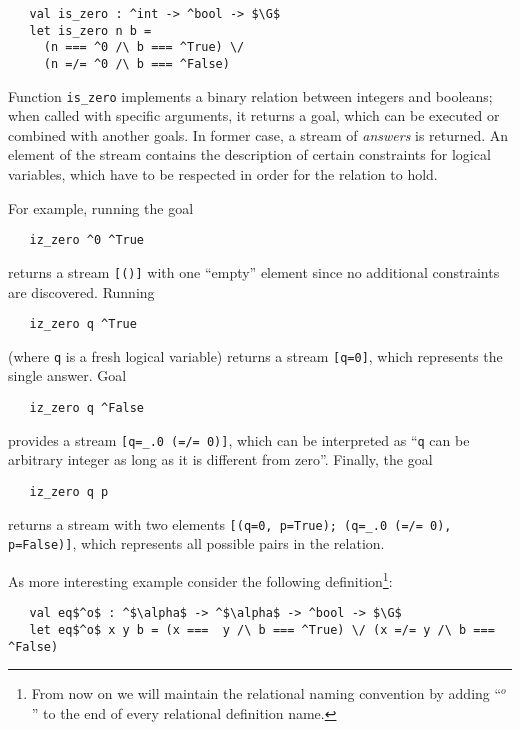 \begin{lstlisting}
   val is_zero : ^int -> ^bool -> $\G$
   let is_zero n b = 
     (n === ^0 /\ b === ^True) \/
     (n =/= ^0 /\ b === ^False)
\end{lstlisting}

Function \lstinline|is_zero| implements a binary relation between integers and booleans; when called with specific arguments, it
returns a goal, which can be executed or combined with another goals. In former case, a stream of \emph{answers} is returned. 
An element of the stream contains the description of certain constraints for logical variables, which have to be respected in
order for the relation to hold. 

For example, running the goal 

\begin{lstlisting}
   iz_zero ^0 ^True
\end{lstlisting}

\noindent returns a stream \lstinline|[()]| with one ``empty'' element since no additional constraints are discovered. 
Running 

\begin{lstlisting}
   iz_zero q ^True
\end{lstlisting}

\noindent (where \lstinline|q| is a fresh logical variable) returns a stream \lstinline|[q=0]|, which represents the single
answer. Goal

\begin{lstlisting}
   iz_zero q ^False
\end{lstlisting}

\noindent provides a stream \lstinline|[q=_.0 (=/= 0)]|, which can be interpreted as ``\lstinline|q| can be arbitrary
integer as long as it is different from zero''. 
Finally, the goal

\begin{lstlisting}
   iz_zero q p
\end{lstlisting}

\noindent returns a stream with two elements \lstinline|[(q=0, p=True); (q=_.0 (=/= 0), p=False)]|, which represents all possible
pairs in the relation.

As more interesting example consider the following definition\footnote{From now on we will maintain the relational naming convention
by adding ``$^o$'' to the end of every relational definition name.}:

\begin{lstlisting}
   val eq$^o$ : ^$\alpha$ -> ^$\alpha$ -> ^bool -> $\G$
   let eq$^o$ x y b = (x ===  y /\ b === ^True) \/ (x =/= y /\ b === ^False)
\end{lstlisting}

